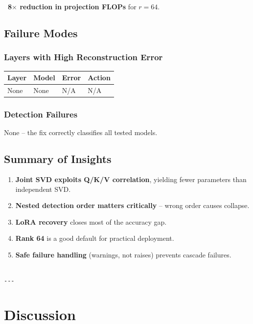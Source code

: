 \textbf{~8$\times$ reduction in projection FLOPs} for $r = 64$.

\subsection{Failure Modes}

\subsubsection{Layers with High Reconstruction Error}

\begin{table}[H]
\centering
\small
\begin{tabular}{llll}
\toprule
\textbf{Layer} & \textbf{Model} & \textbf{Error} & \textbf{Action} \\
\midrule
None & None & N/A & N/A \\
\bottomrule
\end{tabular}
\end{table}

\subsubsection{Detection Failures}

None -- the fix correctly classifies all tested models.

\subsection{Summary of Insights}

\begin{enumerate}
\item \textbf{Joint SVD exploits Q/K/V correlation}, yielding fewer parameters than
  independent SVD.
\item \textbf{Nested detection order matters critically} -- wrong order causes collapse.
\item \textbf{LoRA recovery} closes most of the accuracy gap.
\item \textbf{Rank 64} is a good default for practical deployment.
\item \textbf{Safe failure handling} (warnings, not raises) prevents cascade failures.
\end{enumerate}
\begin{lstlisting}

---
\end{lstlisting}

\section{Discussion}

